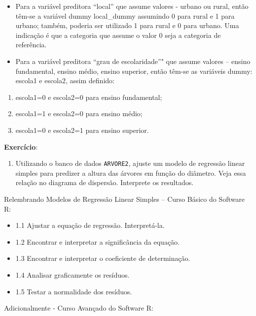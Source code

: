 \documentclass[12pt,brazil,oneside]{book}
\providecommand{\tightlist}{%
  \setlength{\itemsep}{0pt}\setlength{\parskip}{0pt}}
\begin{document}
\begin{itemize}
\item
  Para a variável preditora ``local'' que assume valores - urbano ou
  rural, então têm-se a variável dummy local\_dummy assumindo 0 para
  rural e 1 para urbano; também, poderia ser utilizado 1 para rural e 0
  para urbano. Uma indicação é que a categoria que assume o valor 0 seja
  a categoria de referência.
\item
  Para a variável preditora ``grau de escolaridade''" que assume valores
  -- ensino fundamental, ensino médio, ensino superior, então têm-se as
  variáveis dummy: escola1 e escola2, assim definido:
\end{itemize}

\begin{enumerate}
\def\labelenumi{\alph{enumi}.}
\tightlist
\item
  escola1=0 e escola2=0 para ensino fundamental;
\item
  escola1=1 e escola2=0 para ensino médio;
\item
  escola1=0 e escola2=1 para ensino superior.
\end{enumerate}

\textbf{Exercício}:

\begin{enumerate}
\def\labelenumi{\arabic{enumi})}
\tightlist
\item
  Utilizando o banco de dados \texttt{ARVORE2}, ajuste um modelo de
  regressão linear simples para predizer a altura das árvores em função
  do diâmetro. Veja essa relação no diagrama de dispersão. Interprete os
  resultados.
\end{enumerate}

Relembrando Modelos de Regressão Linear Simples -- Curso Básico do
Software R:

\begin{itemize}
\tightlist
\item
  1.1 Ajustar a equação de regressão. Interpretá-la.
\item
  1.2 Encontrar e interpretar a significância da equação.
\item
  1.3 Encontrar e interpretar o coeficiente de determinação.
\item
  1.4 Analisar graficamente os resíduos.
\item
  1.5 Testar a normalidade dos resíduos.
\end{itemize}

Adicionalmente - Curso Avançado do Software R:
\end{document}

